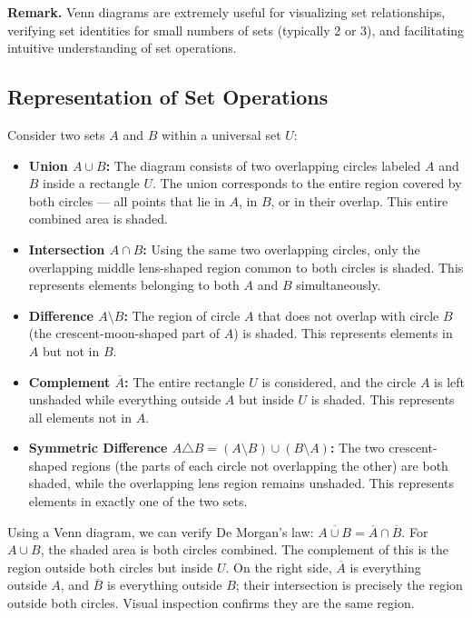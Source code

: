 \documentclass[11pt,a4paper]{article}
\begin{document}
\textbf{Remark.} Venn diagrams are extremely useful for visualizing set relationships, verifying set identities for small numbers of sets (typically 2 or 3), and facilitating intuitive understanding of set operations.

\subsection{Representation of Set Operations}

Consider two sets $A$ and $B$ within a universal set $U$:

\begin{itemize}
    \item \textbf{Union $A \cup B$:} The diagram consists of two overlapping circles labeled $A$ and $B$ inside a rectangle $U$. The union corresponds to the entire region covered by both circles — all points that lie in $A$, in $B$, or in their overlap. This entire combined area is shaded.
    
    \item \textbf{Intersection $A \cap B$:} Using the same two overlapping circles, only the overlapping middle lens-shaped region common to both circles is shaded. This represents elements belonging to both $A$ and $B$ simultaneously.
    
    \item \textbf{Difference $A \setminus B$:} The region of circle $A$ that does not overlap with circle $B$ (the crescent-moon-shaped part of $A$) is shaded. This represents elements in $A$ but not in $B$.
    
    \item \textbf{Complement $\overline{A}$:} The entire rectangle $U$ is considered, and the circle $A$ is left unshaded while everything outside $A$ but inside $U$ is shaded. This represents all elements not in $A$.
    
    \item \textbf{Symmetric Difference $A \triangle B = (A \setminus B) \cup (B \setminus A)$:} The two crescent-shaped regions (the parts of each circle not overlapping the other) are both shaded, while the overlapping lens region remains unshaded. This represents elements in exactly one of the two sets.
\end{itemize}

\begin{example}
Using a Venn diagram, we can verify De Morgan's law: $\overline{A \cup B} = \overline{A} \cap \overline{B}$. For $A \cup B$, the shaded area is both circles combined. The complement of this is the region outside both circles but inside $U$. On the right side, $\overline{A}$ is everything outside $A$, and $\overline{B}$ is everything outside $B$; their intersection is precisely the region outside both circles. Visual inspection confirms they are the same region.
\end{example}
\end{document}
